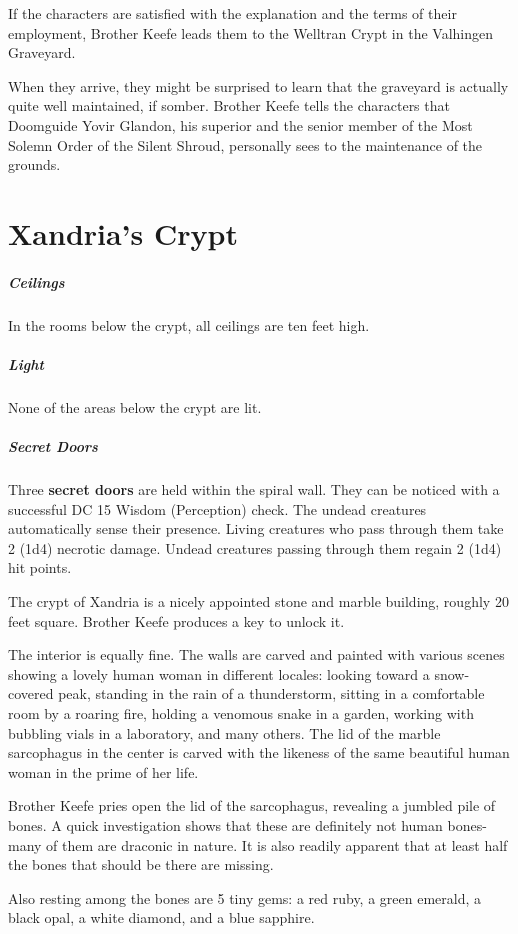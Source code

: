 \documentclass[10pt,a4paper,twoside,bg=print,twocolumn,openany,nodeprecatedcode]{dndbook}
\begin{document}
If the characters are satisfied with the explanation and the terms of their employment, Brother Keefe leads them to the Welltran Crypt in the Valhingen Graveyard.

When they arrive, they might be surprised to learn that the graveyard is actually quite well maintained, if somber. Brother Keefe tells the characters that Doomguide Yovir Glandon, his superior and the senior member of the Most Solemn Order of the Silent Shroud, personally sees to the maintenance of the grounds.

\section{Xandria's Crypt}
\subparagraph{Ceilings}
In the rooms below the crypt, all ceilings are ten feet high.

\subparagraph{Light}
None of the areas below the crypt are lit.

\subparagraph{Secret Doors}
Three \textbf{secret doors} are held within the spiral wall. They can be noticed with a successful DC 15 Wisdom (Perception) check. The undead creatures automatically sense their presence. Living creatures who pass through them take 2 (1d4) necrotic damage. Undead creatures passing through them regain 2 (1d4) hit points.

\begin{DndReadAloud}{}
The crypt of Xandria is a nicely appointed stone and marble building, roughly 20 feet square. Brother Keefe produces a key to unlock it.

The interior is equally fine. The walls are carved and painted with various scenes showing a lovely human woman in different locales: looking toward a snow-covered peak, standing in the rain of a thunderstorm, sitting in a comfortable room by a roaring fire, holding a venomous snake in a garden, working with bubbling vials in a laboratory, and many others. The lid of the marble sarcophagus in the center is carved with the likeness of the same beautiful human woman in the prime of her life.

\end{DndReadAloud}

Brother Keefe pries open the lid of the sarcophagus, revealing a jumbled pile of bones. A quick investigation shows that these are definitely not human bones-many of them are draconic in nature. It is also readily apparent that at least half the bones that should be there are missing.

Also resting among the bones are 5 tiny gems: a red ruby, a green emerald, a black opal, a white diamond, and a blue sapphire.
\end{document}
